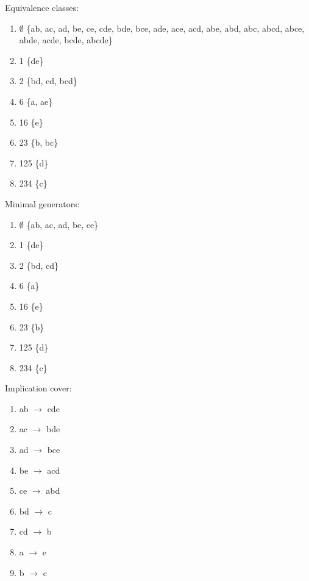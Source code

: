 \begin{minipage}{0.45\textwidth}
Equivalence classes:
\begin{enumerate}
\item $\emptyset$ \{ab, ac, ad, be, ce, cde, bde, bce, ade, ace, acd, abe, abd, abc, abcd, abce, abde, acde, bcde, abcde\}
\item 1 \{de\}
\item 2 \{bd, cd, bcd\}
\item 6 \{a, ae\}
\item 16 \{e\}
\item 23 \{b, bc\}
\item 125 \{d\}
\item 234 \{c\}
\end{enumerate}
\end{minipage}
\hfill
\begin{minipage}{0.45\textwidth}
Minimal generators:
\begin{enumerate}
\item $\emptyset$ \{ab, ac, ad, be, ce\}
\item 1 \{de\}
\item 2 \{bd, cd\}
\item 6 \{a\}
\item 16 \{e\}
\item 23 \{b\}
\item 125 \{d\}
\item 234 \{c\}
\end{enumerate}
\end{minipage}

Implication cover:
\begin{enumerate}
\item ab $\rightarrow$ cde
\item ac $\rightarrow$ bde
\item ad $\rightarrow$ bce
\item be $\rightarrow$ acd
\item ce $\rightarrow$ abd
\item bd $\rightarrow$ c
\item cd $\rightarrow$ b
\item  a $\rightarrow$ e
\item  b $\rightarrow$ c
\end{enumerate}


